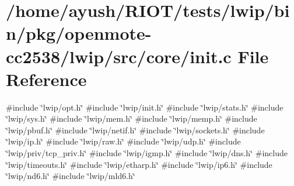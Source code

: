 \hypertarget{openmote-cc2538_2lwip_2src_2core_2init_8c}{}\section{/home/ayush/\+R\+I\+O\+T/tests/lwip/bin/pkg/openmote-\/cc2538/lwip/src/core/init.c File Reference}
\label{openmote-cc2538_2lwip_2src_2core_2init_8c}
{\ttfamily \#include \char`\"{}lwip/opt.\+h\char`\"{}}\newline
{\ttfamily \#include \char`\"{}lwip/init.\+h\char`\"{}}\newline
{\ttfamily \#include \char`\"{}lwip/stats.\+h\char`\"{}}\newline
{\ttfamily \#include \char`\"{}lwip/sys.\+h\char`\"{}}\newline
{\ttfamily \#include \char`\"{}lwip/mem.\+h\char`\"{}}\newline
{\ttfamily \#include \char`\"{}lwip/memp.\+h\char`\"{}}\newline
{\ttfamily \#include \char`\"{}lwip/pbuf.\+h\char`\"{}}\newline
{\ttfamily \#include \char`\"{}lwip/netif.\+h\char`\"{}}\newline
{\ttfamily \#include \char`\"{}lwip/sockets.\+h\char`\"{}}\newline
{\ttfamily \#include \char`\"{}lwip/ip.\+h\char`\"{}}\newline
{\ttfamily \#include \char`\"{}lwip/raw.\+h\char`\"{}}\newline
{\ttfamily \#include \char`\"{}lwip/udp.\+h\char`\"{}}\newline
{\ttfamily \#include \char`\"{}lwip/priv/tcp\+\_\+priv.\+h\char`\"{}}\newline
{\ttfamily \#include \char`\"{}lwip/igmp.\+h\char`\"{}}\newline
{\ttfamily \#include \char`\"{}lwip/dns.\+h\char`\"{}}\newline
{\ttfamily \#include \char`\"{}lwip/timeouts.\+h\char`\"{}}\newline
{\ttfamily \#include \char`\"{}lwip/etharp.\+h\char`\"{}}\newline
{\ttfamily \#include \char`\"{}lwip/ip6.\+h\char`\"{}}\newline
{\ttfamily \#include \char`\"{}lwip/nd6.\+h\char`\"{}}\newline
{\ttfamily \#include \char`\"{}lwip/mld6.\+h\char`\"{}}\newline
